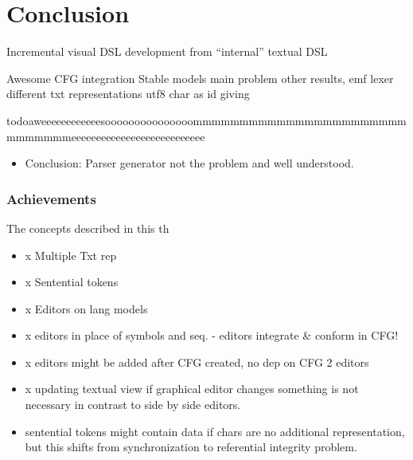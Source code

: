 \chapter{Conclusion}

Incremental visual DSL development from ``internal'' textual DSL

Awesome CFG integration
Stable models main problem
other results,
emf lexer
different txt representations
utf8 char as id giving






todo{aweeeeeeeeeeeesooooooooooooooommmmmmmmmmmmmmmmmmmmmmmmmmmmmmeeeeeeeeeeeeeeeeeeeeeeeeeee}

\begin{itemize}
	\item Conclusion: Parser generator not the problem and well understood.
\end{itemize}	



\subsection{Achievements}
The concepts described in this th
\begin{itemize}
	\item x Multiple Txt rep
	\item x Sentential tokens
	\item x Editors on lang models
	\item x editors in place of symbols and seq. - editors integrate \& conform in CFG!
	\item x editors might be added after CFG created, no dep on CFG 2 editors
	\item x updating textual view if graphical editor changes something is not necessary in contrast to side by side editors.
	\item sentential tokens might contain data if chars are no additional representation, but this shifts from synchronization to referential integrity problem.
\end{itemize}

